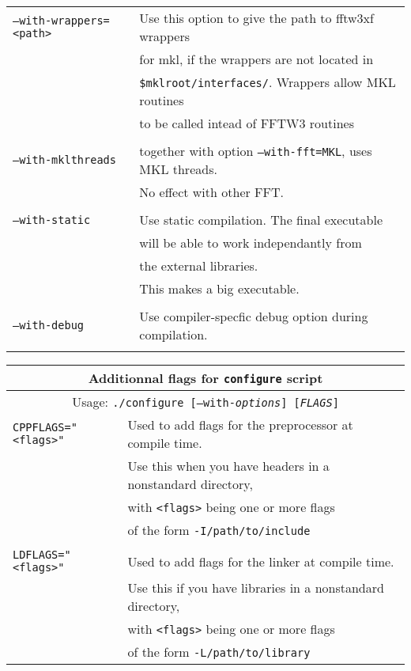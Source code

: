 \documentclass[12pt]{article}
\begin{document}
\begin{center}
\begin{tabular}{ll}
{\tt --with-wrappers=<path>} & Use this option to give the path to fftw3xf wrappers\\
                             & for mkl, if the wrappers are not located in \\
                             & {\tt \$mklroot/interfaces/}. Wrappers allow MKL routines\\
                             & to be called intead of FFTW3 routines\\
\\
{\tt --with-mklthreads} & together with option {\tt --with-fft=MKL}, uses MKL threads. \\
                        & No effect with other FFT.\\
\\
{\tt --with-static} & Use static compilation. The final executable \\
& will be able to work independantly from \\
& the external libraries.\\
& This makes a big executable.\\
\\
{\tt --with-debug} & Use compiler-specfic debug option during compilation. \\
\\
\hline

\end{tabular}
\end{center}

\newpage

\begin{center}
\begin{tabular}{ll}
\hline
\multicolumn{2}{c}{Additionnal flags for {\tt configure} script}\\
\hline
\multicolumn{2}{c}{Usage: {\tt ./configure [--with-{\it options}] [{\it FLAGS}]} } \\
\hline
{\tt CPPFLAGS="<flags>"} & Used to add flags for the preprocessor at compile time.\\
& Use this when you have headers in a nonstandard directory, \\
& with {\tt <flags>} being one or more flags \\
& of the form {\tt -I/path/to/include} \\
\\
{\tt LDFLAGS="<flags>"} &  Used to add flags for the linker at compile time.\\
& Use this if you have libraries in a nonstandard directory,\\
& with {\tt <flags>} being one or more flags \\
& of the form {\tt -L/path/to/library } \\
\hline
\end{tabular}

\end{center}
\end{document}
